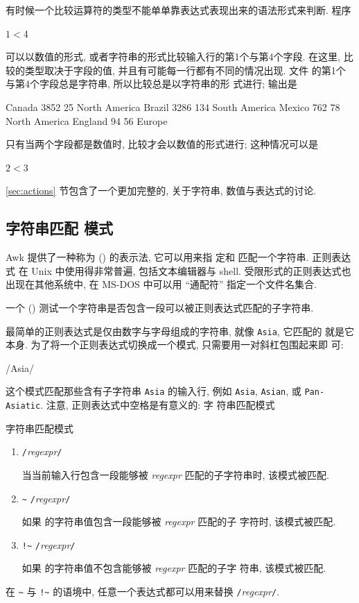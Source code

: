 有时候一个比较运算符的类型不能单单靠表达式表现出来的语法形式来判断. 程序
\begin{awkcode}
    $1 < $4
\end{awkcode}
可以以数值的形式, 或者字符串的形式比较输入行的第1个与第4个字段. 在这里,
比较的类型取决于字段的值, 并且有可能每一行都有不同的情况出现. 文件
 的第1个与第4个字段总是字符串, 所以比较总是以字符串的形
式进行; 输出是
\begin{file}
    Canada      3852    25      North America
    Brazil      3286    134     South America
    Mexico      762     78      North America
    England     94      56      Europe
\end{file}
只有当两个字段都是数值时, 比较才会以数值的形式进行; 这种情况可以是
\begin{awkcode}
    $2 < $3
\end{awkcode}

\ref{sec:actions} 节包含了一个更加完整的, 关于字符串, 数值与表达式的讨论.

\subsection{字符串匹配 模式}
\label{subsec:string_matching_pattern}

Awk 提供了一种称为  (\regexpr) 的表示法, 它可以用来指
定和
匹配一个字符串.  正则表达式 在 Unix 中使用得非常普遍, 包括文本编辑器与
shell. 受限形式的正则表达式也出现在其他系统中, 在 MS-DOS 中可以用
``通配符'' 指定一个文件名集合.

一个  ()
测试一个字符串是否包含一段可以被正则表达式匹配的子字符串.

最简单的正则表达式是仅由数字与字母组成的字符串, 就像 \verb'Asia', 它匹配的
就是它本身. 为了将一个正则表达式切换成一个模式, 只需要用一对斜杠包围起来即
可:
\begin{awkcode}
    /Asia/
\end{awkcode}
这个模式匹配那些含有子字符串 \verb'Asia' 的输入行, 例如 \verb'Asia',
\verb'Asian', 或 \verb'Pan-Asiatic'. 注意, 正则表达式中空格是有意义的: 字
符串匹配模式
\begin{summary}{字符串匹配模式}
    \begin{enumerate}
        \item \verb'/'\textit{regexpr}\verb'/' \par
            当当前输入行包含一段能够被 \textit{regexpr} 匹配的子字符串时,
            该模式被匹配.
        \item \expr {} \verb'~' \verb'/'\textit{regexpr}\verb'/' \par
            如果 \expr 的字符串值包含一段能够被 \textit{regexpr} 匹配的子
            字符时, 该模式被匹配.
        \item \expr {} \verb'!~' \verb'/'\textit{regexpr}\verb'/' \par
            如果 \expr 的字符串值不包含能够被 \textit{regexpr} 匹配的子字
            符串, 该模式被匹配.
    \end{enumerate}
    在 \verb'~' 与 \verb'!~' 的语境中, 任意一个表达式都可以用来替换
    \verb'/'\textit{regexpr}\verb'/'.
\end{summary}

